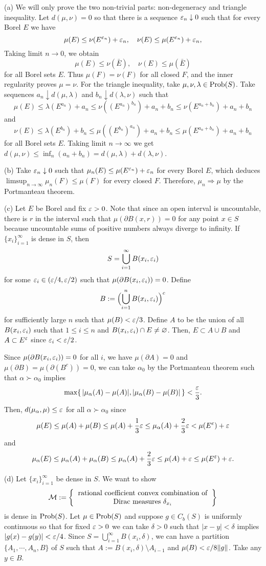 \documentclass[a4paper]{article}
\begin{document}
\begin{pf}
(a)
We will only prove the two non-trivial parts: non-degeneracy and triangle inequality.
Let $d(\mu,\nu)=0$ so that there is a sequence $\varepsilon_n\downarrow0$ such that for every Borel $E$ we have
\[\mu(E)\le\nu(E^{\varepsilon_n})+\varepsilon_n,\quad\nu(E)\le\mu(E^{\varepsilon_n})+\varepsilon_n,\]
Taking limit $n\to0$, we obtain
\[\mu(E)\le\nu(\bar E),\quad\nu(E)\le\mu(\bar E)\]
for all Borel sets $E$.
Thus $\mu(F)=\nu(F)$ for all closed $F$, and the inner regularity proves $\mu=\nu$.
For the triangle inequality, take $\mu,\nu,\lambda\in\operatorname{Prob}(S)$.
Take sequences $a_n\downarrow d(\mu,\lambda)$ and $b_n\downarrow d(\lambda,\nu)$ such that
\[\mu(E)\le\lambda(E^{a_n})+a_n\le\nu((E^{a_n})^{b_n})+a_n+b_n\le\nu(E^{a_n+b_n})+a_n+b_n\]
and
\[\nu(E)\le\lambda(E^{b_n})+b_n\le\mu((E^{b_n})^{a_n})+a_n+b_n\le\mu(E^{a_n+b_n})+a_n+b_n\]
for all Borel sets $E$.
Taking limit $n\to\infty$ we get $d(\mu,\nu)\le\inf_n(a_n+b_n)=d(\mu,\lambda)+d(\lambda,\nu)$.

(b)
Take $\varepsilon_n\downarrow0$ such that $\mu_n(E)\le\mu(E^{\varepsilon_n})+\varepsilon_n$ for every Borel $E$, which deduces $\limsup_{n\to\infty}\mu_n(F)\le\mu(F)$ for every closed $F$.
Therefore, $\mu_n\Rightarrow\mu$ by the Portmanteau theorem.

(c)
Let $E$ be Borel and fix $\varepsilon>0$.
Note that since an open interval is uncountable, there is $r$ in the interval such that $\mu(\partial B(x,r))=0$ for any point $x\in S$ because uncountable sums of positive numbers always diverge to infinity.
If $\{x_i\}_{i=1}^\infty$ is dense in $S$, then
\[S=\bigcup_{i=1}^\infty B(x_i,\varepsilon_i)\]
for some $\varepsilon_i\in(\varepsilon/4,\varepsilon/2)$ such that $\mu(\partial B(x_i,\varepsilon_i))=0$.
Define
\[B:=\Bigl(\bigcup_{i=1}^nB(x_i,\varepsilon_i)\Bigr)^c\]
for sufficiently large $n$ such that $\mu(B)<\varepsilon/3$.
Define $A$ to be the union of all $B(x_i,\varepsilon_i)$ such that $1\le i\le n$ and $B(x_i,\varepsilon_i)\cap E\ne\varnothing$.
Then, $E\subset A\cup B$ and $A\subset E^\varepsilon$ since $\varepsilon_i<\varepsilon/2$.

Since $\mu(\partial B(x_i,\varepsilon_i))=0$ for all $i$, we have $\mu(\partial A)=0$ and $\mu(\partial B)=\mu(\partial(B^c))=0$, we can take $\alpha_0$ by the Portmanteau theorem such that $\alpha\succ\alpha_0$ implies
\[\max\{\,|\mu_\alpha(A)-\mu(A)|,|\mu_\alpha(B)-\mu(B)|\,\}<\frac{\varepsilon}3.\]
Then, $d(\mu_\alpha,\mu)\le\varepsilon$ for all $\alpha\succ\alpha_0$ since
\[\mu(E)\le\mu(A)+\mu(B)\le\mu(A)+\frac13\varepsilon\le\mu_\alpha(A)+\frac23\varepsilon<\mu(E^\varepsilon)+\varepsilon\]
and
\[\mu_\alpha(E)\le\mu_\alpha(A)+\mu_\alpha(B)\le\mu_\alpha(A)+\frac23\varepsilon\le\mu(A)+\varepsilon\le\mu(E^\varepsilon)+\varepsilon.\]

(d)
Let $\{x_i\}_{i=1}^\infty$ be dense in $S$.
We want to show
\[\cM:=\left\{\begin{tabular}{c}rational coefficient convex combination of\\Dirac measures $\delta_{x_i}$\end{tabular}\right\}\]
is dense in $\operatorname{Prob}(S)$.
Let $\mu\in\operatorname{Prob}(S)$ and suppose $g\in C_b(S)$ is uniformly continuous so that for fixed $\varepsilon>0$ we can take $\delta>0$ such that $|x-y|<\delta$ implies $|g(x)-g(y)|<\varepsilon/4$.
Since $S=\bigcup_{i=1}^\infty B(x_i,\delta)$, we can have a partition $\{A_1,\cdots,A_n,B\}$ of $S$ such that $A:=B(x_i,\delta)\setminus A_{i-1}$ and $\mu(B)<\varepsilon/8\|g\|$.
Take any $y\in B$.


\end{pf}
\end{document}

